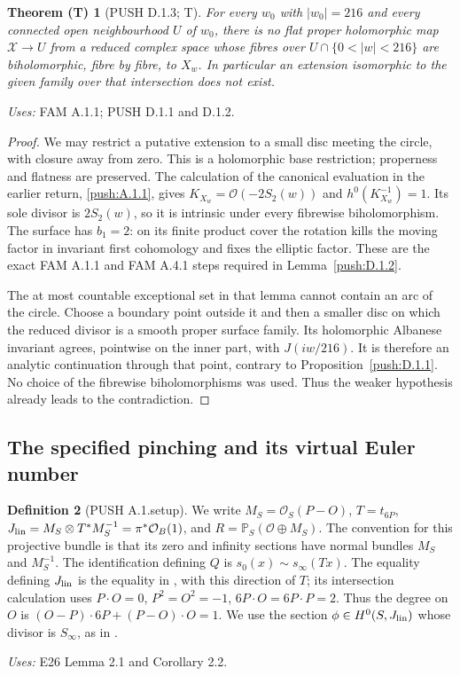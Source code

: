 \documentclass[11pt,a4paper]{article}
\theoremstyle{plain}
\newtheorem{theorem}{Theorem (T)}[section]
\theoremstyle{definition}
\newtheorem{definition}[theorem]{Definition}
\begin{document}
\begin{theorem}[PUSH D.1.3; T]\label{push:D.1.3}
For every \(w_0\) with \(|w_0|=216\) and every connected open
neighbourhood \(U\) of \(w_0\), there is no flat proper holomorphic
map \(\mathcal X\to U\) from a reduced complex space whose fibres
over \(U\cap\{0<|w|<216\}\) are biholomorphic, fibre by fibre, to
\(X_w\). In particular an extension isomorphic to the given family
over that intersection does not exist.
\end{theorem}
\noindent\emph{Uses:} FAM A.1.1; PUSH D.1.1 and D.1.2.\par

\begin{proof}
We may restrict a putative extension to a small disc meeting the
circle, with closure away from zero. This is a holomorphic base
restriction; properness and flatness are preserved. The calculation
of the canonical evaluation in the earlier return, \ref{push:A.1.1}, gives
\(K_{X_w}=\mathcal O(-2S_2(w))\) and
\(h^0(K_{X_w}^{-1})=1\). Its sole divisor is \(2S_2(w)\), so it is
intrinsic under every fibrewise biholomorphism. The surface has
\(b_1=2\): on its finite product cover the rotation kills the moving
factor in invariant first cohomology and fixes the elliptic factor.
These are the exact FAM A.1.1 and FAM A.4.1 steps required in Lemma~\ref{push:D.1.2}.

The at most countable exceptional set in that lemma cannot contain
an arc of the circle. Choose a boundary point outside it and then a smaller disc
on which the reduced divisor is a smooth proper surface family. Its
holomorphic Albanese invariant agrees, pointwise on the inner part,
with \(J(iw/216)\). It is therefore an analytic continuation through
that point, contrary to Proposition~\ref{push:D.1.1}. No choice of the
fibrewise biholomorphisms was used. Thus the weaker hypothesis already
leads to the contradiction.
\end{proof}

\subsection{The specified pinching and its virtual Euler number}
\begin{definition}[PUSH A.1.setup]\label{push:A.1.setup}
We write $M_S=\mathcal O_S(P-O)$, $T=t_{6P}$,
$J_{\rm lin}=M_S\otimes T^*M_S^{-1}=\pi^*\mathcal O_B(1)$, and
$R=\mathbb P_S(\mathcal O\oplus M_S)$. The convention for this projective
bundle is that its zero and infinity sections have normal bundles
$M_S$ and $M_S^{-1}$. The identification defining $Q$ is
$s_0(x)\sim s_\infty(Tx)$. The equality defining $J_{\rm lin}$ is the equality
in \cite[Lemma~2.1]{E26}, with this direction of $T$; its intersection
calculation uses $P\cdot O=0$, $P^2=O^2=-1$,
$6P\cdot O=6P\cdot P=2$. Thus the degree on $O$ is
$(O-P)\cdot6P+(P-O)\cdot O=1$. We use the section
$\phi\in H^0(S,J_{\rm lin})$ whose divisor is $S_\infty$, as in \cite[Corollary~2.2]{E26}. 
\end{definition}
\noindent\emph{Uses:} E26 Lemma 2.1 and Corollary 2.2.\par
\end{document}
